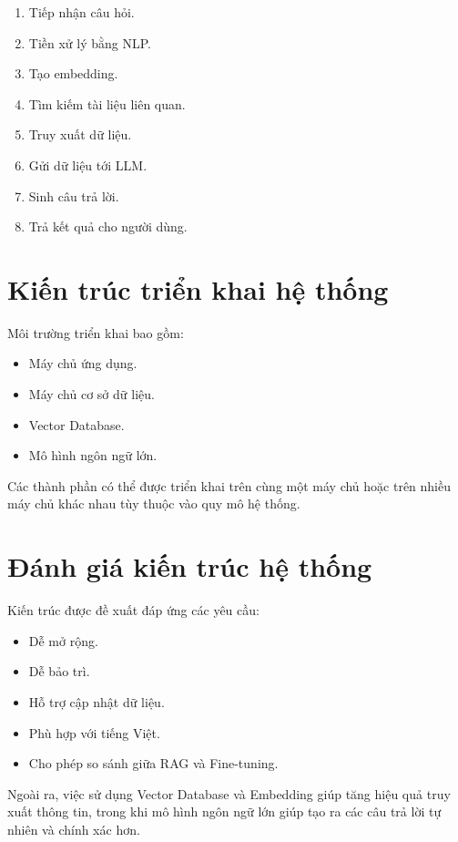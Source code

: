 \documentclass[12pt,a4paper]{report}
\begin{document}
	\begin{enumerate}
		\item Tiếp nhận câu hỏi.
		\item Tiền xử lý bằng NLP.
		\item Tạo embedding.
		\item Tìm kiếm tài liệu liên quan.
		\item Truy xuất dữ liệu.
		\item Gửi dữ liệu tới LLM.
		\item Sinh câu trả lời.
		\item Trả kết quả cho người dùng.
	\end{enumerate}
	
	\section{Kiến trúc triển khai hệ thống}
	
	Môi trường triển khai bao gồm:
	
	\begin{itemize}
		\item Máy chủ ứng dụng.
		\item Máy chủ cơ sở dữ liệu.
		\item Vector Database.
		\item Mô hình ngôn ngữ lớn.
	\end{itemize}
	
	Các thành phần có thể được triển khai trên cùng một máy chủ hoặc trên nhiều máy chủ khác nhau tùy thuộc vào quy mô hệ thống.
	
	\section{Đánh giá kiến trúc hệ thống}
	
	Kiến trúc được đề xuất đáp ứng các yêu cầu:
	
	\begin{itemize}
		\item Dễ mở rộng.
		\item Dễ bảo trì.
		\item Hỗ trợ cập nhật dữ liệu.
		\item Phù hợp với tiếng Việt.
		\item Cho phép so sánh giữa RAG và Fine-tuning.
	\end{itemize}
	
	Ngoài ra, việc sử dụng Vector Database và Embedding giúp tăng hiệu quả truy xuất thông tin, trong khi mô hình ngôn ngữ lớn giúp tạo ra các câu trả lời tự nhiên và chính xác hơn.
	
\end{document}
